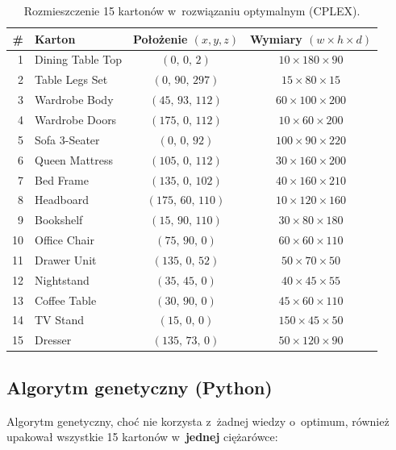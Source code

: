 \documentclass[12pt]{article}
\begin{document}
\begin{table}[H]
\centering
\begin{tabular}{rlcc}
\toprule
\# & Karton & Położenie $(x,y,z)$ & Wymiary $(w\times h\times d)$ \\
\midrule
1  & Dining Table Top & $(0,\,0,\,2)$     & $10\times180\times90$  \\
2  & Table Legs Set   & $(0,\,90,\,297)$  & $15\times80\times15$   \\
3  & Wardrobe Body    & $(45,\,93,\,112)$ & $60\times100\times200$ \\
4  & Wardrobe Doors   & $(175,\,0,\,112)$ & $10\times60\times200$  \\
5  & Sofa 3-Seater    & $(0,\,0,\,92)$    & $100\times90\times220$ \\
6  & Queen Mattress   & $(105,\,0,\,112)$ & $30\times160\times200$ \\
7  & Bed Frame        & $(135,\,0,\,102)$ & $40\times160\times210$ \\
8  & Headboard        & $(175,\,60,\,110)$& $10\times120\times160$ \\
9  & Bookshelf        & $(15,\,90,\,110)$ & $30\times80\times180$  \\
10 & Office Chair     & $(75,\,90,\,0)$   & $60\times60\times110$  \\
11 & Drawer Unit      & $(135,\,0,\,52)$  & $50\times70\times50$   \\
12 & Nightstand       & $(35,\,45,\,0)$   & $40\times45\times55$   \\
13 & Coffee Table     & $(30,\,90,\,0)$   & $45\times60\times110$  \\
14 & TV Stand         & $(15,\,0,\,0)$    & $150\times45\times50$  \\
15 & Dresser          & $(135,\,73,\,0)$  & $50\times120\times90$  \\
\bottomrule
\end{tabular}
\caption{Rozmieszczenie 15 kartonów w~rozwiązaniu optymalnym (CPLEX).}
\end{table}

\subsection{Algorytm genetyczny (Python)}

Algorytm genetyczny, choć nie korzysta z~żadnej wiedzy o~optimum, również upakował wszystkie 15 kartonów w~\textbf{jednej} ciężarówce:
\end{document}
